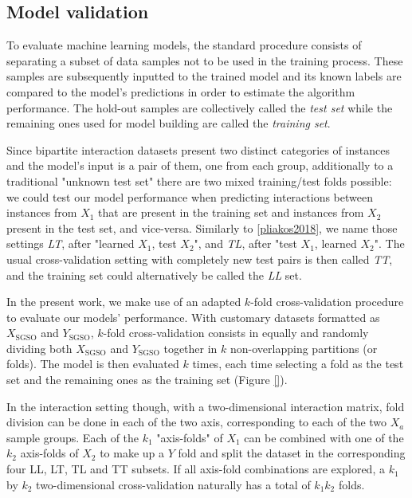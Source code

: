 \subsection{Model validation}
\label{sec:cross_validation}

To evaluate machine learning models, the standard procedure consists of separating a subset of data samples not to be used in the training process. These samples are subsequently inputted to the trained model and its known labels are compared to the model's predictions in order to estimate the algorithm performance. The hold-out samples are collectively called the \emph{test set} while the remaining ones used for model building are called the \emph{training set}.

Since bipartite interaction datasets present two distinct categories of instances and the model's input is a pair of them, one from each group, additionally to a traditional "unknown test set" there are two mixed training/test folds possible: we could test our model performance when predicting interactions between instances from $X_1$ that are present in the training set and instances from $X_2$ present in the test set, and vice-versa. Similarly to \ref{pliakos2018}, %
we name those settings \emph{LT}, after "learned $X_1$, test $X_2$", and \emph{TL}, after "test $X_1$, learned $X_2$". The usual cross-validation setting with completely new test pairs is then called \emph{TT}, and the training set could alternatively be called the \emph{LL} set.

In the present work, we make use of an adapted $k$-fold cross-validation procedure to evaluate our models' performance. With customary datasets formatted as $X_\text{SGSO}$ and $Y_\text{SGSO}$, $k$-fold cross-validation consists in equally and randomly dividing both $X_\text{SGSO}$ and $Y_\text{SGSO}$ together in $k$ non-overlapping partitions (or folds). The model is then evaluated $k$ times, each time selecting a fold as the test set and the remaining ones as the training set (Figure \ref{}).

In the interaction setting though, with a two-dimensional interaction matrix, fold division can be done in each of the two axis, corresponding to each of the two $X_a$ sample groups. Each of the $k_1$ "axis-folds" of $X_1$ can be combined with one of the $k_2$ axis-folds of $X_2$ to make up a $Y$ fold and split the dataset in the corresponding four LL, LT, TL and TT subsets. If all axis-fold combinations are explored, a $k_1$ by $k_2$ two-dimensional cross-validation naturally has a total of $k_1k_2$ folds. 

